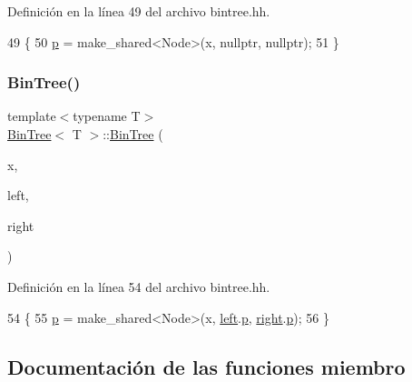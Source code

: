 Definición en la línea 49 del archivo bintree.\+hh.


\begin{DoxyCode}
49                          \{
50         \mbox{\hyperlink{class_bin_tree_afe3647af1dda90f6ddf1deee6560fcf1}{p}} = make\_shared<Node>(x, \textcolor{keyword}{nullptr}, \textcolor{keyword}{nullptr});
51     \}
\end{DoxyCode}
\mbox{\label{class_bin_tree_adb7eeff76d08130c943b36af215eb521}} 
\subsubsection{\texorpdfstring{Bin\+Tree()}{BinTree()}\hspace{0.1cm}{\footnotesize\ttfamily [4/4]}}
{\footnotesize\ttfamily template$<$typename T$>$ \\
\mbox{\hyperlink{class_bin_tree}{Bin\+Tree}}$<$ T $>$\+::\mbox{\hyperlink{class_bin_tree}{Bin\+Tree}} (\begin{DoxyParamCaption}\item[{const T \&}]{x,  }\item[{const \mbox{\hyperlink{class_bin_tree}{Bin\+Tree}}$<$ T $>$ \&}]{left,  }\item[{const \mbox{\hyperlink{class_bin_tree}{Bin\+Tree}}$<$ T $>$ \&}]{right }\end{DoxyParamCaption})}



Definición en la línea 54 del archivo bintree.\+hh.


\begin{DoxyCode}
54                                                                     \{
55         \mbox{\hyperlink{class_bin_tree_afe3647af1dda90f6ddf1deee6560fcf1}{p}} = make\_shared<Node>(x, \mbox{\hyperlink{class_bin_tree_a82108db4c1b08d1f111027788c196d4e}{left}}.\mbox{\hyperlink{class_bin_tree_afe3647af1dda90f6ddf1deee6560fcf1}{p}}, \mbox{\hyperlink{class_bin_tree_aff8e96651b27284c329667b5ad3e4d0b}{right}}.\mbox{\hyperlink{class_bin_tree_afe3647af1dda90f6ddf1deee6560fcf1}{p}});
56     \}
\end{DoxyCode}


\subsection{Documentación de las funciones miembro}
\mbox{\label{class_bin_tree_a74cda259ba5c25b8ee38ed4dc33e4fad}} 
